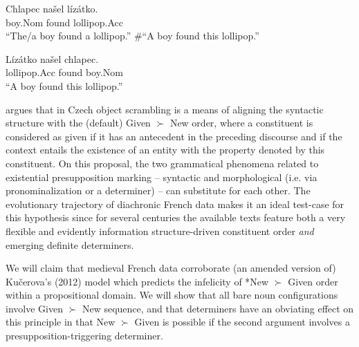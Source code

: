 \documentclass[output=paper,modfonts,nonflat]{langsci/langscibook}
\begin{document}
\ea\label{ex:czech1}
\gll Chlapec na\v{s}el l\'{i}z\'{a}tko.\\
boy.Nom found lollipop.Acc\\
\glt ``The/a boy found a lollipop.'' \#``A boy found this lollipop.'' 
\z

\ea\label{ex:czech2}
\gll L\'{i}z\'{a}tko na\v{s}el chlapec.\\
lollipop.Acc found boy.Nom \\
\glt ``A boy found this lollipop.''
\z



 
\citet{Kucerova:2012} argues that in Czech object scrambling is a means of aligning the syntactic structure with the (default) Given $\succ$ New order, where a constituent is considered as given if it has an antecedent in the preceding discourse and if the context entails the existence of an entity with the property denoted by this constituent. On this proposal, the two grammatical phenomena related to existential presupposition marking -- syntactic and morphological (i.e. via pronominalization or a determiner) -- can substitute for each other. The evolutionary trajectory of diachronic French data makes it an ideal test-case for this hypothesis since for several centuries the available texts feature both a very flexible and evidently information structure-driven constituent order {\itshape and} emerging definite determiners. 

We will claim that medieval French data corroborate (an amended version of) Ku\v{c}erova's (2012) model which predicts the infelicity of *New $\succ$ Given order within a propositional domain. We will show that all bare noun configurations involve Given $\succ$ New sequence, and that determiners have an obviating effect on this principle in that New $\succ$ Given is possible if the second argument involves a presupposition-triggering determiner. 
\end{document}
